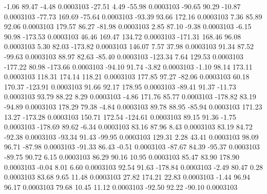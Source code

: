        -1.06       89.47       -4.48     0.0003103
      -27.51        4.49      -55.98     0.0003103
      -90.65       90.29      -10.87     0.0003103
      -77.73      169.69      -75.64     0.0003103
      -93.39       93.66      172.16     0.0003103
        7.36       85.89       92.06     0.0003103
      179.57       86.27      -81.98     0.0003103
        2.85       87.10       -9.38     0.0003103
       -6.15       90.98     -173.53     0.0003103
       46.46      169.47      134.72     0.0003103
     -171.31      168.46       96.08     0.0003103
        5.30       82.03     -173.82     0.0003103
      146.07        7.57       37.98     0.0003103
       91.34       87.52      -99.63     0.0003103
       88.97       82.63      -85.40     0.0003103
     -123.34        7.64      129.53     0.0003103
     -177.22       80.98     -173.66     0.0003103
      -94.10       91.74       -3.82     0.0003103
       -1.10       98.14      173.11     0.0003103
      118.31      174.14      118.21     0.0003103
      177.85       97.27      -82.06     0.0003103
       60.18      170.37     -123.91     0.0003103
       91.66       92.17      178.95     0.0003103
      -89.41       91.37      -11.73     0.0003103
       93.79       88.22        8.29     0.0003103
       -4.86      171.76       85.77     0.0003103
     -178.82       83.19      -94.89     0.0003103
      178.29       79.38       -4.84     0.0003103
       89.78       88.95      -85.94     0.0003103
      171.23       13.27     -173.28     0.0003103
      150.71      172.54     -124.61     0.0003103
       89.15       91.36       -1.75     0.0003103
     -178.69       89.62       -6.34     0.0003103
       83.16       87.96        8.43     0.0003103
       83.19       84.72      -92.38     0.0003103
      -93.34       91.43      -99.95     0.0003103
      129.31        2.28       43.41     0.0003103
       98.09       96.71      -87.98     0.0003103
      -91.33       86.43       -0.51     0.0003103
      -87.67       84.39      -95.37     0.0003103
      -89.75       90.72        6.15     0.0003103
       86.29       90.16       10.95     0.0003103
       85.47       83.90      178.90     0.0003103
       -0.04        8.01        6.60     0.0003103
       92.54       91.63     -178.84     0.0003103
       -2.49       80.47        0.28     0.0003103
       83.68        9.65       11.48     0.0003103
       27.82      174.21       22.83     0.0003103
       -1.44       96.94       96.17     0.0003103
       79.68       10.45       11.12     0.0003103
      -92.50       92.22      -90.10     0.0003103
